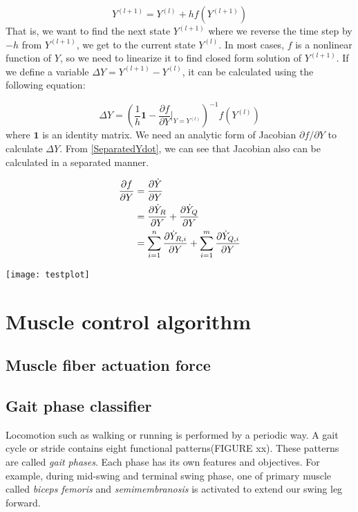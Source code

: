 \documentclass[a4paper,10pt]{article}
\begin{document}
\begin{equation}
Y^{(l+1)}=Y^{(l)}+hf(Y^{(l+1)})
\end{equation}
That is, we want to find the next state $Y^{(l+1)}$ where we
reverse the time step by $-h$ from $Y^{(l+1)}$, we get to the current state
$Y^{(l)}$. In most cases, $f$ is a nonlinear function of $Y$, so we need to
linearize it to find closed form solution of $Y^{(l+1)}$. If we define a
variable $\Delta Y = Y^{(l+1)}-Y^{(l)}$, it can be calculated using the
following equation:

\begin{equation}\label{DeltaY}
\Delta Y = \left(  \frac{1}{h}\mathbf{1} - {\frac{\partial f}{\partial Y} \bigg|_{Y=Y^{(l)}}}\right)^{-1} f(Y^{(l)})
\end{equation}
where $\mathbf{1}$ is an identity matrix. We need an analytic form of
Jacobian $\partial f / \partial Y$ to calculate $\Delta Y$.
From \eqref{SeparatedYdot}, we can see that
Jacobian also can be calculated in a separated manner.


\begin{align}
\frac{\partial f}{\partial Y}
        & = \frac{\partial\dot{Y}}{\partial Y}\notag\\
        & = \frac{\partial\dot{Y}_R}{\partial Y} + \frac{\partial\dot{Y}_Q}{\partial Y}\notag\\
        & = \sum_{i=1}^{n}\frac{\partial\dot{Y}_{R,i}}{\partial Y} + \sum_{i=1}^{m}\frac{\partial\dot{Y}_{Q,i}}{\partial Y}
\end{align}

\texttt{[image: testplot]}


\section{Muscle control algorithm}

\subsection{Muscle fiber actuation force}

\subsection{Gait phase classifier}

Locomotion such as walking or running is performed by a periodic way.
A gait cycle or stride contains eight functional patterns(FIGURE xx).
\cite{perry} These patterns are called \emph{gait phases}. Each phase has its
own features and objectives. For example, during mid-swing and terminal swing
phase, one of primary muscle called \emph{biceps femoris} and \emph{semimembranosis} is
activated to extend our swing leg forward.
\end{document}
